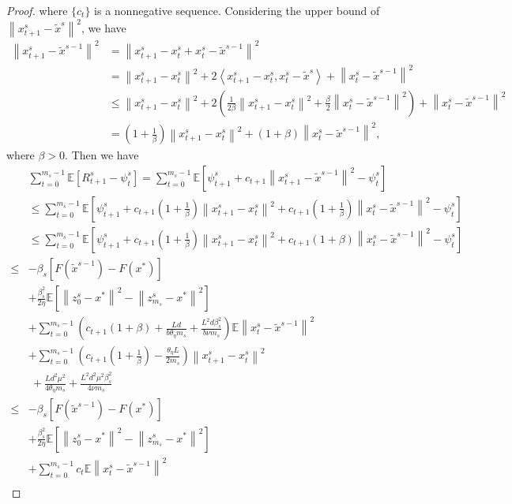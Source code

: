 \documentclass{article}
\newcommand*{\E}{\mathbb{E}}
\newcommand{\norm}[1]{\left\lVert#1\right\rVert}
\newcommand{\Iprod}[2]{\left\langle #1,#2\right\rangle}
\theoremstyle{definition}
\theoremstyle{remark}
\begin{document}
{\begin{proof}
where $\{c_t\}$ is a nonnegative sequence. Considering the upper bound of $\norm{x_{t+1}^s-\widetilde{x}^s}^2$, we have
\begin{equation}
\begin{split}
\norm{x_{t+1}^s-\widetilde{x}^{s-1}}^2 &= \norm{x_{t+1}^s-x_t^s+x_t^s-\widetilde{x}^{s-1}}^2\\
&=\norm{x_{t+1}^s-x_t^s}^2+2\Iprod{x_{t+1}^s-x_t^s}{x_t^s-\widetilde{x}^s}+\norm{x_t^s-\widetilde{x}^{s-1}}^2\\
&\leq \norm{x_{t+1}^s-x_{t}^s}^2 + 2(\frac{1}{2\beta}\norm{x_{t+1}^s-x_{t}^s}^2+\frac{\beta}{2}\norm{x_t^s-\widetilde{x}^{s-1}}^2)+\norm{x_t^s-\widetilde{x}^{s-1}}^2\\
&= (1+\frac{1}{\beta})\norm{x_{t+1}^s-x_{t}^s}^2+(1+\beta)\norm{x_t^s-\widetilde{x}^{s-1}}^2,
\end{split}
\end{equation}
where $\beta > 0$. Then we have 
\begin{equation}
\begin{split}
&\sum_{t=0}^{m_s-1} \E[R_{t+1}^s - \psi_{t}^s] = \sum_{t=0}^{m_s-1}\E\left[\psi_{t+1}^s+ c_{t+1}\norm{x_{t+1}^s-\tilde{x}^{s-1}}^2- \psi_{t}^s\right]\\
&\leq \sum_{t=0}^{m_s-1}\E\left[\psi_{t+1}^s+ c_{t+1}(1+\frac{1}{\beta})\norm{x_{t+1}^s-x_{t}^s}^2+ c_{t+1}(1+\frac{1}{\beta})\norm{x_{t}^s-\tilde{x}^{s-1}}^2- \psi_{t}^s\right]\\
&\leq \sum_{t=0}^{m_s-1}\E\left[\psi_{t+1}^s+ c_{t+1}(1+\frac{1}{\beta})\norm{x_{t+1}^s-x_{t}^s}^2+ c_{t+1}(1+{\beta})\norm{x_{t}^s-\tilde{x}^{s-1}}^2- \psi_{t}^s\right]\\
\leq &-\beta_s[F(\widetilde{x}^{s-1})-F(x^*)] \\
&+ {\frac{ \beta_s^2}{2\eta}}\E[\norm{z_{0}^s-x^*}^2-\norm{z_{m_s}^s-x^*}^2]\\
&+ \sum_{t=0}^{m_s-1} (c_{t+1}(1+{\beta})+\frac{Ld}{b\theta_{\eta} m_s}+\frac{L^2d\beta_s^2}{b\nu m_s})\E\norm{x_t^s-\widetilde{x}^{s-1}}^2\\
&+\sum_{t=0}^{m_s-1}(c_{t+1}(1+\frac{1}{\beta})-\frac{\theta_{\eta} L}{2m_s})\norm{x_{t+1}^s-x_{t}^s}^2\\
&~+\frac{Ld^2\mu^2}{4\theta_{\eta}m_s}+\frac{ L^2d^2\mu^2\beta_s^2}{4\nu m_s}\\
\leq &-\beta_s[F(\widetilde{x}^{s-1})-F(x^*)] \\
&+ {\frac{ \beta_s^2}{2\eta}}\E[\norm{z_{0}^s-x^*}^2-\norm{z_{m_s}^s-x^*}^2]\\
&+ \sum_{t=0}^{m_s-1} c_t\E\norm{x_t^s-\widetilde{x}^{s-1}}^2\\

\end{split}
\end{equation}
\end{proof}}
\end{document}
